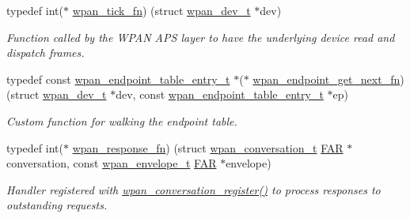 \begin{DoxyCompactItemize}
typedef int($\ast$ \hyperlink{group__wpan__aps_gafed1542f6becf2d81fd84ef2f0ae2833}{wpan\+\_\+tick\+\_\+fn}) (struct \hyperlink{structwpan__dev__t}{wpan\+\_\+dev\+\_\+t} $\ast$dev)
\begin{DoxyCompactList}\small\item\em Function called by the W\+P\+AN A\+PS layer to have the underlying device read and dispatch frames. \end{DoxyCompactList}\item 
typedef const \hyperlink{structwpan__endpoint__table__entry__t}{wpan\+\_\+endpoint\+\_\+table\+\_\+entry\+\_\+t} $\ast$($\ast$ \hyperlink{group__wpan__aps_ga4239e4654962f88f42a53abae18e7827}{wpan\+\_\+endpoint\+\_\+get\+\_\+next\+\_\+fn}) (struct \hyperlink{structwpan__dev__t}{wpan\+\_\+dev\+\_\+t} $\ast$dev, const \hyperlink{structwpan__endpoint__table__entry__t}{wpan\+\_\+endpoint\+\_\+table\+\_\+entry\+\_\+t} $\ast$ep)
\begin{DoxyCompactList}\small\item\em Custom function for walking the endpoint table. \end{DoxyCompactList}\item 
typedef int($\ast$ \hyperlink{group__wpan__aps_gabf0a6b85c9ff3ff9104c8b58c1436d72}{wpan\+\_\+response\+\_\+fn}) (struct \hyperlink{structwpan__conversation__t}{wpan\+\_\+conversation\+\_\+t} \hyperlink{group__hal_gaef060b3456fdcc093a7210a762d5f2ed}{F\+AR} $\ast$conversation, const \hyperlink{structwpan__envelope__t}{wpan\+\_\+envelope\+\_\+t} \hyperlink{group__hal_gaef060b3456fdcc093a7210a762d5f2ed}{F\+AR} $\ast$envelope)
\begin{DoxyCompactList}\small\item\em Handler registered with \hyperlink{group__wpan__aps_gae5f88ed40bd334d963e261947b77b980}{wpan\+\_\+conversation\+\_\+register()} to process responses to outstanding requests. \end{DoxyCompactList}\end{DoxyCompactItemize}
